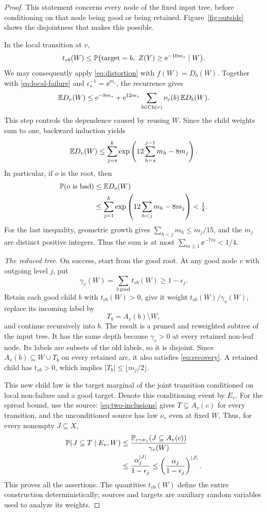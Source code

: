 \begin{proof}
This statement concerns every node of the fixed input tree, before
conditioning on that node being good or being retained. Figure~\ref{fig:outside}
shows the disjointness that makes this possible.


In the local transition at $v$,
\[
 t_{vb}(W)\le
 \mathbb P\bigl(\mathrm{target}=b,\ Z(Y)\ge\mathrm e^{-10m_s}\mid W\bigr).
\]
We may consequently apply \eqref{eq:distortion} with $f(W)=D_b(W)$.
Together with \eqref{eq:local-failure} and
$\epsilon_s^{-1}=\ee^{m_s}$, the recurrence gives
\begin{equation}\label{eq:expected-potential}
 \mathbb E D_v(W)
 \le \mathrm e^{-8m_s}
    +\mathrm e^{12m_s}\sum_{b\in\operatorname{Ch}(v)}\nu_v(b)\,\mathbb E D_b(W).
\end{equation}
This step controls the dependence caused by reusing $W$.
Since the child weights sum to one, backward induction yields
\[
 \mathbb E D_v(W)\le
 \sum_{j=s}^k
 \exp\left(12\sum_{h=s}^{j-1}m_h-8m_j\right).
\]
In particular, if $o$ is the root, then
\begin{align*}
 \mathbb P(o\text{ is bad})
 &\le\mathbb E D_o(W)\\
 &\le\sum_{j=1}^k
   \exp\left(12\sum_{h<j}m_h-8m_j\right)
 <\tfrac14.
\end{align*}
For the last inequality, geometric growth gives
$\sum_{h<j}m_h\le m_j/15$, and the $m_j$ are distinct positive
integers. Thus the sum is at most
$\sum_{m\ge1}\ee^{-7m}<1/4$.

\medskip\noindent
\textit{The reduced tree.}
On success, start from the good root. At any good node $v$ with
outgoing level $j$, put
\[
 \gamma_v(W)=\sum_{b\ \mathrm{good}}t_{vb}(W)\ge1-\epsilon_j.
\]
Retain each good child $b$ with $t_{vb}(W)>0$, give it weight
$t_{vb}(W)/\gamma_v(W)$, replace its incoming label by
\[
 T_b=A_v(b)\setminus W,
\]
and continue recursively into $b$. The result is a pruned and
reweighted subtree of the input tree. It has the same depth because
$\gamma_v>0$ at every retained non-leaf node. Its labels are subsets
of the old labels, so it is disjoint. Since
$A_v(b)\subseteq W\cup T_b$ on every retained arc, it also satisfies
\eqref{eq:recovery}. A retained child has $t_{vb}>0$, which implies
$|T_b|\le\lfloor m_j/2\rfloor$.

This new child law is the target marginal of the joint transition
conditioned on local non-failure and a good target. Denote this
conditioning event by $E_v$. For the spread bound, use the source:
\eqref{eq:two-inclusions} gives $T\subseteq A_v(c)$ for every
transition, and the unconditioned source has law $\nu_v$ even at fixed
$W$. Thus, for every nonempty $J\subseteq X$,
\begin{align*}
 \mathbb P(J\subseteq T\mid E_v,W)
 &\le\frac{\mathbb P_{c\sim\nu_v}(J\subseteq A_v(c))}{\gamma_v(W)}\\
 &\le\frac{\alpha_j^{|J|}}{1-\epsilon_j}
 \le\left(\frac{\alpha_j}{1-\epsilon_j}\right)^{|J|}.
\end{align*}
This proves all the assertions. The quantities $t_{vb}(W)$ define
the entire construction deterministically; sources and targets are
auxiliary random variables used to analyze its weights.
\end{proof}

